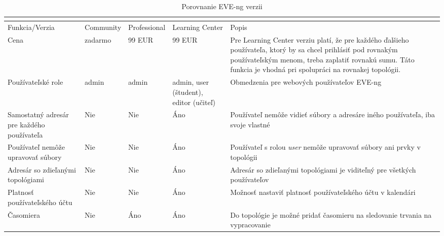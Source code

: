 \newpage

\begin{longtable}{| m{3cm} | m{2cm} | m{2cm} | m{2cm} | m{4cm} |}
\caption{Porovnanie EVE-ng verzii}
\cite{eve_ng_versions_table}
\label{tab:eve_ng_versions} \\
\hline
Funkcia/Verzia                                      & Community         & Professional    & Learning Center      & Popis                                                                                                   \\ \hline
Cena                                                 & zadarmo              & 99 EUR  & 99 EUR & Pre Learning Center verziu platí, že pre každého ďalšieho používateľa, ktorý by sa chcel prihlásiť pod rovnakým používateľským menom, treba zaplatiť rovnakú sumu. Táto funkcia je vhodná pri spolupráci na rovnakej topológii.
\\ \hline
Používateľské role                                          & admin        & admin      & admin, user (študent), editor (učiteľ)  & Obmedzenia pre webových používateľov EVE-ng \\ \hline
Samostatný adresár pre každého používateľa                                  & Nie                & Nie              & Áno                  & Používateľ nemôže vidieť súbory a adresáre iného používateľa, iba svoje vlastné \\ \hline
Používateľ nemôže upravovať súbory                                 & Nie                & Nie              & Áno                  & Používateľ s rolou \emph{user} nemôže upravovať súbory ani prvky v topológii                                                                             \\ \hline
Adresár so zdieľanými topológiami                                     & Nie                & Nie              & Áno                  & Adresár so zdieľanými topológiami je viditeľný pre všetkých používateľov                                                                       \\ \hline
Platnosť používateľského účtu         & Nie                & Nie              & Áno                  & Možnosť nastaviť platnosť používateľského účtu v kalendári                         \\ \hline
Časomiera                                             & Nie                & Áno             & Áno                  & Do topológie je možné pridať časomieru na sledovanie trvania na vypracovanie                                                                                          \\ \hline

\end{longtable}
